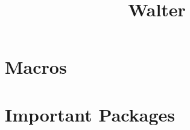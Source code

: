 

\title{Walter}

\let\oldtitlepage\DoTitlepage
\let\DoTitlepage\relax



\makeatletter









\titlepage
\begin{frame}
\end{frame}

\begin{frame}
   \TitleImageLoad\relax
\end{frame}

\section{Macros}
\begin{frame}{\insertsection}

\end{frame}

\section[Packages]{Important Packages}
\begin{frame}{\insertsection}

\end{frame}

